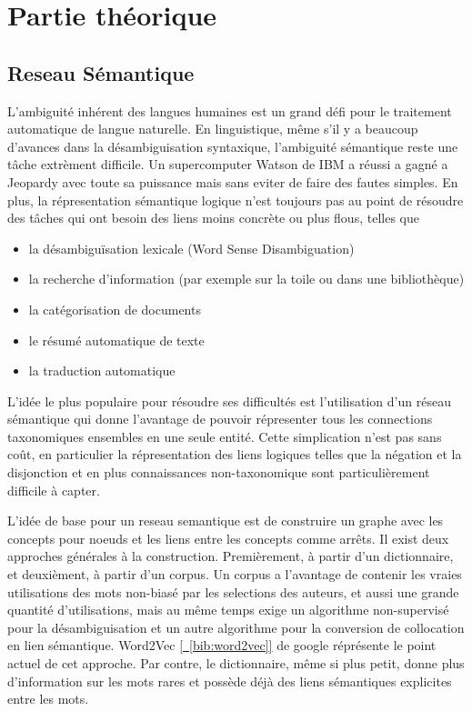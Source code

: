 \section{Partie théorique}

\subsection{Reseau Sémantique}

L'ambiguité inhérent des langues humaines est un grand défi pour le traitement automatique
de langue naturelle. En linguistique, même s'il y a beaucoup d'avances dans la
désambiguisation syntaxique, l'ambiguité sémantique reste une tâche extrèment difficile.
Un supercomputer Watson de IBM a réussi a gagné a Jeopardy avec toute sa
puissance mais sans eviter de faire des fautes simples. En plus, la répresentation
sémantique logique n'est toujours pas au point de résoudre des tâches qui ont
besoin des liens moins concrète ou plus flous, telles que
\begin{itemize}
\item la désambiguïsation lexicale (Word Sense Disambiguation)
\item la recherche d'information (par exemple sur la toile ou dans une bibliothèque)
\item la catégorisation de documents
\item le résumé automatique de texte
\item la traduction automatique
\end{itemize}
L'idée le plus populaire pour résoudre ses difficultés est l'utilisation d'un réseau
sémantique qui donne l'avantage de pouvoir répresenter tous les connections taxonomiques
ensembles en une seule entité. Cette simplication n'est pas sans coût, en particulier
la répresentation des liens logiques telles que la négation et la disjonction 
et en plus connaissances non-taxonomique sont particulièrement difficile à capter.

L'idée de base pour un reseau semantique est de construire un graphe avec
les concepts pour noeuds et les liens entre les concepts comme arrêts.
Il exist deux approches générales à la construction. Premièrement, à
partir d'un dictionnaire, et deuxièment, à partir d'un corpus.
Un corpus a l'avantage de contenir les vraies utilisations des mots non-biasé
par les selections des auteurs, et aussi une grande
quantité d'utilisations, mais au même temps exige un algorithme non-supervisé pour la
désambiguisation et un autre algorithme pour la conversion de collocation en lien sémantique.
Word2Vec \hyperref[bib:word2vec]{[~\ref*{bib:word2vec}]} de
google réprésente le point actuel de cet approche.
Par contre, le dictionnaire, même si plus petit, donne plus
d'information sur les mots rares et possède déjà des liens sémantiques explicites entre
les mots.

